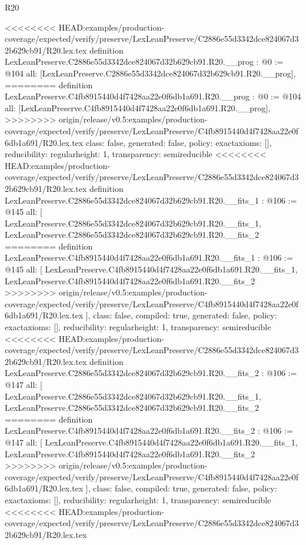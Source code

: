 \begin{lexlean}{R20}
\begin{coremodule}
<<<<<<<< HEAD:examples/production-coverage/expected/verify/preserve/LexLeanPreserve/C2886e55d3342dce824067d32b629cb91/R20.lex.tex
definition LexLeanPreserve.C2886e55d3342dce824067d32b629cb91.R20.__prog : @0 := @104 {
  all: [LexLeanPreserve.C2886e55d3342dce824067d32b629cb91.R20.__prog],
========
definition LexLeanPreserve.C4fb8915440d4f7428aa22e0f6db1a691.R20.__prog : @0 := @104 {
  all: [LexLeanPreserve.C4fb8915440d4f7428aa22e0f6db1a691.R20.__prog],
>>>>>>>> origin/release/v0.5:examples/production-coverage/expected/verify/preserve/LexLeanPreserve/C4fb8915440d4f7428aa22e0f6db1a691/R20.lex.tex
  class: false,
  generated: false,
  policy: exact{axioms: []},
  reducibility: regular{height: 1},
  transparency: semireducible
}
<<<<<<<< HEAD:examples/production-coverage/expected/verify/preserve/LexLeanPreserve/C2886e55d3342dce824067d32b629cb91/R20.lex.tex
definition LexLeanPreserve.C2886e55d3342dce824067d32b629cb91.R20.__fits_1 : @106 := @145 {
  all: [
    LexLeanPreserve.C2886e55d3342dce824067d32b629cb91.R20.__fits_1,
    LexLeanPreserve.C2886e55d3342dce824067d32b629cb91.R20.__fits_2
========
definition LexLeanPreserve.C4fb8915440d4f7428aa22e0f6db1a691.R20.__fits_1 : @106 := @145 {
  all: [
    LexLeanPreserve.C4fb8915440d4f7428aa22e0f6db1a691.R20.__fits_1,
    LexLeanPreserve.C4fb8915440d4f7428aa22e0f6db1a691.R20.__fits_2
>>>>>>>> origin/release/v0.5:examples/production-coverage/expected/verify/preserve/LexLeanPreserve/C4fb8915440d4f7428aa22e0f6db1a691/R20.lex.tex
  ],
  class: false,
  compiled: true,
  generated: false,
  policy: exact{axioms: []},
  reducibility: regular{height: 1},
  transparency: semireducible
}
<<<<<<<< HEAD:examples/production-coverage/expected/verify/preserve/LexLeanPreserve/C2886e55d3342dce824067d32b629cb91/R20.lex.tex
definition LexLeanPreserve.C2886e55d3342dce824067d32b629cb91.R20.__fits_2 : @106 := @147 {
  all: [
    LexLeanPreserve.C2886e55d3342dce824067d32b629cb91.R20.__fits_1,
    LexLeanPreserve.C2886e55d3342dce824067d32b629cb91.R20.__fits_2
========
definition LexLeanPreserve.C4fb8915440d4f7428aa22e0f6db1a691.R20.__fits_2 : @106 := @147 {
  all: [
    LexLeanPreserve.C4fb8915440d4f7428aa22e0f6db1a691.R20.__fits_1,
    LexLeanPreserve.C4fb8915440d4f7428aa22e0f6db1a691.R20.__fits_2
>>>>>>>> origin/release/v0.5:examples/production-coverage/expected/verify/preserve/LexLeanPreserve/C4fb8915440d4f7428aa22e0f6db1a691/R20.lex.tex
  ],
  class: false,
  compiled: true,
  generated: false,
  policy: exact{axioms: []},
  reducibility: regular{height: 1},
  transparency: semireducible
}
<<<<<<<< HEAD:examples/production-coverage/expected/verify/preserve/LexLeanPreserve/C2886e55d3342dce824067d32b629cb91/R20.lex.tex
}}}
\end{coremodule}
\end{lexlean}
